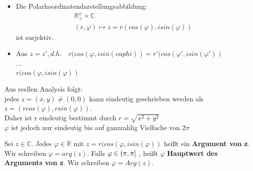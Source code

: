 \begin{itemize}
	\item
	Die Polarkoordinatendarstellungsabbildung:
	\begin{eqnarray*}
	\mathds{R}^x_+ \times \mathds{C} \\
	(r,\varphi) \mapsto z = r(cos(\varphi),i sin(\varphi))
	\end{eqnarray*}
	ist surjektiv.
	\item
	Aus $z = z', d.h.\quad r(cos(\varphi, i sin(vaphi)) = r'(cos(\varphi', i sin(\varphi'))$\\
	...\\$r(cos(\varphi, i sin(\varphi))$
\end{itemize}
\begin{bew}
	Aus reellen Analysis folgt: \\
	jedes $z = (x,y) \neq (0,0)$ kann eindeutig geschrieben werden als $z = (r cos(\varphi), rsin(\varphi))$. \\
	Daher ist r eindeutig bestimmt durch $r = \sqrt{x^2 + y^2}$ \\
	$\varphi$ ist jedoch nur eindeutig bis auf ganzzahlig Vielfache von $2\pi$
\end{bew}


\begin{definition}
	Sei $z \in \mathds{C}$. Jedes $\varphi \in  \mathds{R}$ mit $z =r(cos(\varphi, i sin(\varphi))  $ heißt ein \textbf{Argument von z}. Wir schreiben $\varphi = arg(z)$.
	Falls $\varphi \in (\-\pi,\pi]$ , heißt $\varphi$ \textbf{Hauptwert des Arguments von z}. Wir schreiben $\varphi = Arg(z)$.
\end{definition}
